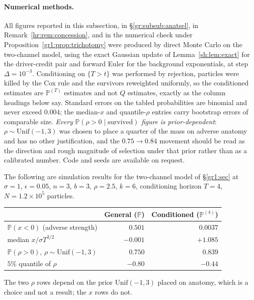 \documentclass[11pt]{article}
\numberwithin{equation}{section}
\theoremstyle{plain}
\theoremstyle{definition}
\theoremstyle{remark}
\newcommand{\PP}{\mathbb{P}}
\begin{document}
\paragraph{Numerical methods.} All figures reported in this subsection,
in \S\ref{gr:subsub:anatsel}, in Remark~\ref{hr:rem:concession}, and in
the numerical check under Proposition~\ref{gr1:prop:trichotomy} were
produced by direct Monte Carlo on the two-channel model, using the exact
Gaussian update of Lemma~\ref{sh:lem:exact} for the driver-credit pair
and forward Euler for the background exponentials, at step
$\Delta=10^{-3}$. Conditioning on $\{T>t\}$ was performed by rejection, particles were killed by the Cox rule and the survivors reweighted
uniformly, so the conditioned estimates are $\PP^{(T)}$ estimates and
not $Q$ estimates, exactly as the column headings below say. Standard
errors on the tabled probabilities are binomial and never exceed
$0.004$; the median-$x$ and quantile-$\rho$ entries carry bootstrap
errors of comparable size. \emph{Every $\PP(\rho>0\mid\text{survived})$
figure is prior-dependent}: $\rho\sim\mathrm{Unif}(-1,3)$ was chosen to
place a quarter of the mass on adverse anatomy and has no other
justification, and the $0.75\to0.84$ movement should be read as the
direction and rough magnitude of selection under that prior rather than
as a calibrated number. Code and seeds are available on request.

The following are simulation results for the two-channel model of
\S\ref{gr1:sec} at $\sigma=1$, $\epsilon=0.05$, $n=3$, $b=3$, $\rho=2.5$,
$k=6$, conditioning horizon $T=4$, $N=1.2\times10^{5}$ particles.

\begin{center}\small
\begin{tabular}{@{}lrr@{}}
\toprule
& General ($\PP$) & Conditioned ($\PP^{(4)}$)\\
\midrule
$\PP(x<0)$ (adverse strength) & $0.501$ & $0.0037$\\
median $x/\sigma T^{3/2}$ & $-0.001$ & $+1.085$\\
$\PP(\rho>0)$, $\rho\sim\mathrm{Unif}(-1,3)$ & $0.750$ & $0.839$\\
$5\%$ quantile of $\rho$ & $-0.80$ & $-0.44$\\
\bottomrule
\end{tabular}
\end{center}

\noindent The two $\rho$ rows depend on the prior $\mathrm{Unif}(-1,3)$
placed on anatomy, which is a choice and not a result; the $x$ rows do
not.
\end{document}
